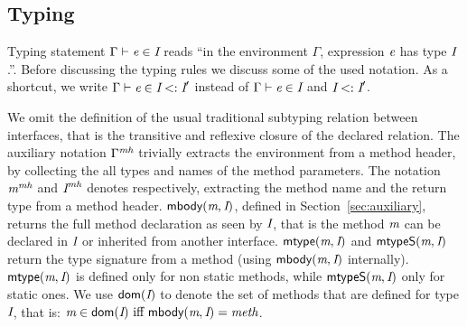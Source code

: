 \subsection{Typing}

Typing statement $\Gamma \vdash \textit{e}\in\textit{I}$ reads ``in the environment
$\Gamma$, expression $\textit{e}$ has type $\textit{I}$.''.
Before discussing the typing rules we discuss some of the used notation.
As a shortcut, we write
$\Gamma \vdash \textit{e}\in\textit{I}<:\textit{I}'$ instead of $\Gamma \vdash \textit{e}\in\textit{I}$ and
$\textit{I}<:\textit{I}'$.

We omit the definition of
the usual traditional subtyping relation between interfaces, that is the transitive and reflexive closure of the declared \Q@extends@ relation.
The auxiliary notation $\Gamma^\textit{mh}$ trivially
extracts the environment from a method header, by collecting the all types
and names of the method parameters.  The
notation $\textit{m}^\textit{mh}$ and $\textit{I}^\textit{mh}$ denotes respectively, extracting the
method name and the return type from a method header. $\textsf{mbody}(\textit{m},\textit{I})$,
defined in Section~\ref{sec:auxiliary},
returns the full method declaration as seen by $\textit{I}$, that is the
method $\textit{m}$ can be declared in $\textit{I}$ or inherited from another
interface.
$\textsf{mtype}(\textit{m},\textit{I})$ and $\textsf{mtypeS}(\textit{m},\textit{I})$ return the type
signature from a method (using $\textsf{mbody}(\textit{m},\textit{I})$ internally).
$\textsf{mtype}(\textit{m},\textit{I})$ is defined only for non static methods, while
$\textsf{mtypeS}(\textit{m},\textit{I})$ only for static ones. We use $\textsf{dom}(\textit{I})$ to
denote the set of methods that are defined for type $\textit{I}$, that is:
$\m\in\dom(\C)\ \miff \ \mBody(\m,\C)=\method$.

